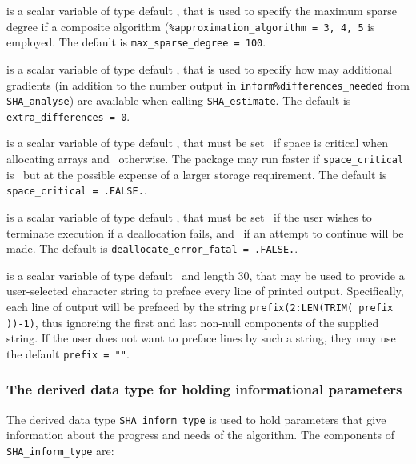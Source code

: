 \documentclass{galahad}
\newcommand{\packagename}{SHA}
\begin{document}
\begin{description}
 is a scalar variable of type default \integer, 
that is used to specify the maximum sparse degree if a composite algorithm
({\tt \%approximation\_algorithm = 3, 4, 5} is employed.
The default is {\tt max\_sparse\_degree = 100}.

 is a scalar variable of type default \integer, 
that is used to specify how may additional gradients (in addition to the number
output in {\tt inform\%differences\_needed} from {\tt \packagename\_\-analyse})
are available when calling {\tt \packagename\_\-estimate}.
The default is {\tt extra\_differences = 0}.

 is a scalar variable of type default \logical, 
that must be set \true\ if space is critical when allocating arrays
and  \false\ otherwise. The package may run faster if 
{\tt space\_critical} is \false\ but at the possible expense of a larger
storage requirement. The default is {\tt space\_critical = .FALSE.}.

 is a scalar variable of type default \logical, 
that must be set \true\ if the user wishes to terminate execution if
a deallocation  fails, and \false\ if an attempt to continue
will be made. The default is {\tt deallocate\_error\_fatal = .FALSE.}.

 is a scalar variable of type default \character\
and length 30, that may be used to provide a user-selected 
character string to preface every line of printed output. 
Specifically, each line of output will be prefaced by the string 
{\tt prefix(2:LEN(TRIM( prefix ))-1)},
thus ignoreing the first and last non-null components of the
supplied string. If the user does not want to preface lines by such
a string, they may use the default {\tt prefix = ""}.

\end{description}


\subsubsection{The derived data type for holding informational
 parameters}\label{typeinform}
The derived data type 
{\tt \packagename\_inform\_type} 
is used to hold parameters that give information about the progress and needs 
of the algorithm. The components of 
{\tt \packagename\_inform\_type} 
are:
\end{document}

